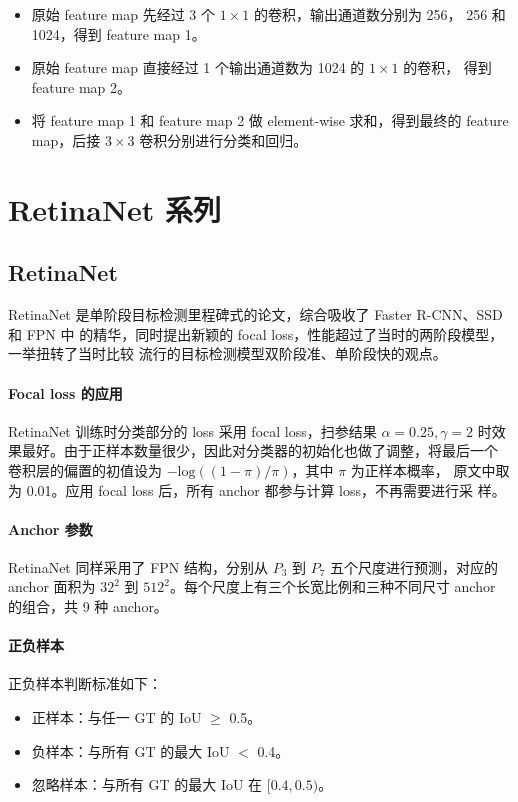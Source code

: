 \begin{itemize}
  \item 原始 feature map 先经过 3 个 $1 \times 1$ 的卷积，输出通道数分别为 256，
    256 和 1024，得到 feature map 1。
  \item 原始 feature map 直接经过 1 个输出通道数为 1024 的 $1 \times 1$ 的卷积，
    得到 feature map 2。
  \item 将 feature map 1 和 feature map 2 做 element-wise 求和，得到最终的
    feature map，后接 $3 \times 3$ 卷积分别进行分类和回归。
\end{itemize}

\section{RetinaNet 系列}

\subsection{RetinaNet}
\label{sub:RetinaNet}

RetinaNet 是单阶段目标检测里程碑式的论文，综合吸收了 Faster R-CNN、SSD 和 FPN 中
的精华，同时提出新颖的 focal loss，性能超过了当时的两阶段模型，一举扭转了当时比较
流行的目标检测模型双阶段准、单阶段快的观点。

\paragraph{Focal loss 的应用}
RetinaNet 训练时分类部分的 loss 采用 focal loss，扫参结果 $\alpha = 0.25, \gamma
= 2$ 时效果最好。由于正样本数量很少，因此对分类器的初始化也做了调整，将最后一个
卷积层的偏置的初值设为 $-\mathrm{log}((1 - \pi)/ \pi)$，其中 $\pi$ 为正样本概率，
原文中取为 0.01。应用 focal loss 后，所有 anchor 都参与计算 loss，不再需要进行采
样。

\paragraph{Anchor 参数}
RetinaNet 同样采用了 FPN 结构，分别从 $P_3$ 到 $P_7$ 五个尺度进行预测，对应的
anchor 面积为 $32^2$ 到 $512^2$。每个尺度上有三个长宽比例和三种不同尺寸 anchor
的组合，共 9 种 anchor。

\paragraph{正负样本}
正负样本判断标准如下：
\begin{itemize}
\item 正样本：与任一 GT 的 IoU $\geq$ 0.5。
\item 负样本：与所有 GT 的最大 IoU $ < $ 0.4。
\item 忽略样本：与所有 GT 的最大 IoU 在 $[0.4, 0.5)$。
\end{itemize}

